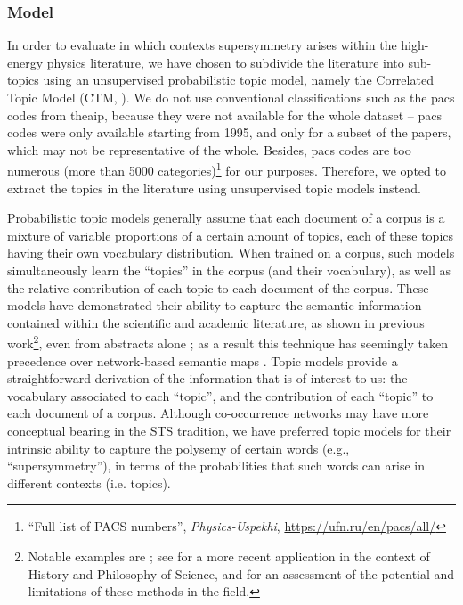 \documentclass[smallextended]{svjour3}
\begin{document}
\subsubsection{Model}

In order to evaluate in which contexts supersymmetry arises within the high-energy physics literature, we have chosen to subdivide the literature into sub-topics using an unsupervised probabilistic topic model, namely the Correlated Topic Model (CTM, \citealt{Blei2007}). We do not use conventional classifications such as the \gls{pacs} codes from the\gls{aip}, because they were not available for the whole dataset -- \gls{pacs} codes were only available starting from 1995, and only for a subset of the papers, which may not be representative of the whole. Besides, \gls{pacs} codes are too numerous (more than 5000 categories)\footnote{``Full list of PACS numbers'', \textit{
Physics-Uspekhi}, \url{https://ufn.ru/en/pacs/all/}} for our purposes. Therefore, we opted to extract the topics in the literature using unsupervised topic models instead. %

Probabilistic topic models generally assume that each document of a corpus is a mixture of variable proportions of a certain amount of topics, each of these topics having their own vocabulary distribution. When trained on a corpus, such models simultaneously learn the ``topics'' in the corpus (and their vocabulary), as well as the relative contribution of each topic to each document of the corpus. These models have demonstrated their ability to capture the semantic information contained within the scientific and academic literature, as shown in previous work\footnote{Notable examples are \citealt{Nichols2014,Hall2008,Griffiths2004}; see \citealt{Malaterre2022} for a more recent application in the context of History and Philosophy of Science, and \citealt{Allen2022} for an assessment of the potential and limitations of these methods in the field.}, even from abstracts alone \citep{Syed2017}; as a result this technique has seemingly taken precedence over network-based semantic maps \citep[Figure~1]{Leydesdorff2016}. Topic models provide a straightforward derivation of the information that is of interest to us: the vocabulary associated to each ``topic'', and the contribution of each ``topic'' to each document of a corpus. Although co-occurrence networks may have more conceptual bearing in the STS tradition, we have preferred topic models for their intrinsic ability to capture the polysemy of certain words (e.g., ``supersymmetry''), in terms of the probabilities that such words can arise in different contexts (i.e. topics).
\end{document}
